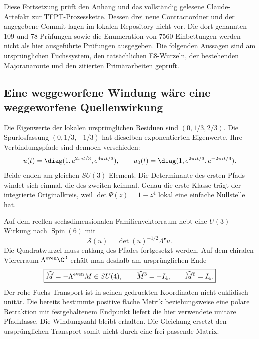 Diese Fortsetzung prüft den Anhang  und das vollständig gelesene \href{https://claude.ai/artifact/QKsCJRb79D8Z3pbxqV54n2}{Claude-Artefakt zur TFPT-Prozesskette}. Dessen drei neue Contractordner und der angegebene Commit lagen im lokalen Repository nicht vor. Die dort genannten 109 und 78 Prüfungen sowie die Enumeration von 7560 Einbettungen werden nicht als hier ausgeführte Prüfungen ausgegeben. Die folgenden Aussagen sind am ursprünglichen Fuchssystem, den tatsächlichen E8-Wurzeln, der bestehenden Majoranaroute und den zitierten Primärarbeiten geprüft.

\subsection{Eine weggeworfene Windung wäre eine weggeworfene Quellenwirkung}
Die Eigenwerte der lokalen ursprünglichen Residuen sind $(0,1/3,2/3)$. Die Spurlosfassung $(0,1/3,-1/3)$ hat dieselben exponentierten Eigenwerte. Ihre Verbindungspfade sind dennoch verschieden:
\begin{equation}
u(t)=\diag(1,e^{2\pi it/3},e^{4\pi it/3}),\qquad
u_0(t)=\diag(1,e^{2\pi it/3},e^{-2\pi it/3}).
\end{equation}
Beide enden am gleichen $SU(3)$-Element. Die Determinante des ersten Pfads windet sich einmal, die des zweiten keinmal. Genau die erste Klasse trägt der integrierte Originalkreis, weil $\det\Psi(z)=1-z^4$ lokal eine einfache Nullstelle hat.

Auf dem reellen sechsdimensionalen Familienvektorraum hebt eine $U(3)$-Wirkung nach $\operatorname{Spin}(6)$ mit
\begin{equation}
\mathcal S(u)=\det(u)^{-1/2}\Lambda^\bullet u .
\end{equation}
Die Quadratwurzel muss entlang des Pfades fortgesetzt werden. Auf dem chiralen Viererraum $\Lambda^{\rm even}\C^3$ erhält man deshalb am ursprünglichen Ende
\begin{equation}\label{eq:nativespinlift}
\boxed{\widehat M=-\Lambda^{\rm even}M\in SU(4),\qquad
\widehat M^3=-I_4,\qquad \widehat M^6=I_4.}
\end{equation}
Der rohe Fuchs-Transport ist in seinen gedruckten Koordinaten nicht euklidisch unitär. Die bereits bestimmte positive flache Metrik beziehungsweise eine polare Retraktion mit festgehaltenem Endpunkt liefert die hier verwendete unitäre Pfadklasse. Die Windungszahl bleibt erhalten. Die Gleichung ersetzt den ursprünglichen Transport somit nicht durch eine frei passende Matrix.

